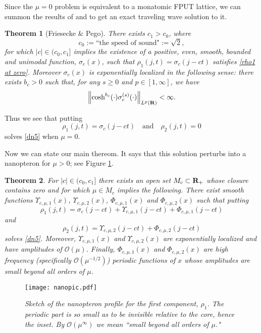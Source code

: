 \documentclass[12pt]{amsart}
\numberwithin{equation}{section}
\newtheorem{theorem}{Theorem}[section]
\newcommand{\be}{\begin{equation}}
\newcommand{\ee}{\end{equation}}
\newcommand{\mand}{\quad \text{and}\quad}
\newcommand{\R}{{\bf{R}}}
\renewcommand{\O}{{\mathcal{O}}}
\begin{document}
Since the $\mu=0$ problem is equivalent to a monatomic FPUT lattice, we can summon the results of \cite{friesecke-wattis} and \cite{friesecke-pego1}
to get an exact traveling wave solution to it.
\begin{theorem} [Friesecke \& Pego]\label{sigma exists}
There exists $c_1 > c_0$, where
\be \label{speed of sound}c_0:= \text{``the speed of sound"}:=\sqrt{2}, \ee 
for which  $|c| \in (c_0,c_1]$ 
implies the existence of a positive, even, smooth, bounded and unimodal function, $\sigma_c(x)$, 
such that
$\rho_1(j,t) = \sigma_c(j-ct)$
satisfies \eqref{rho1 at zero}. 
Moreover $\sigma_c(x)$ is exponentially localized
in the following sense: there exists
$b_c>0$ such that, for any $s \ge 0$ and $p \in [1,\infty]$, we have
\be\label{sigma is localized}
\left \| \cosh^{b_c}(\cdot)  {\sigma^{(s)}_c(\cdot) } \right\|_{L^p(\R)} < \infty.
\ee
\end{theorem}


Thus we see that putting
\be\label{mu zero}
\rho_1(j,t) = \sigma_c(j-ct) \mand \rho_2(j,t) = 0
\ee
solves \eqref{dn5} when $\mu =0$.

Now we can state our main thereom. It says that this solution 
perturbs into a nanopteron for $\mu > 0$; see Figure \ref{nanopic}.
\begin{theorem}\label{nontech main}
For $|c| \in (c_0,c_1]$
there exists an open set $M_c \subset \R_+$ whose
closure contains zero and for which $\mu \in M_c$ implies the following. There exist smooth functions 
$\Upsilon_{c,\mu,1}(x)$, $\Upsilon_{c,\mu,2}(x)$, $\Phi_{c,\mu,1}(x)$ and $\Phi_{c,\mu,2}(x)$ such that 
putting
$$\rho_1(j,t) = \sigma_c(j-ct)+\Upsilon_{c,\mu,1}(j-ct)+\Phi_{c,\mu,1}(j-ct)$$
and
$$\rho_2(j,t) = \Upsilon_{c,\mu,2}(j-ct)+\Phi_{c,\mu,2}(j-ct) $$ 
  solves \eqref{dn5}. Moreover, $\Upsilon_{c,\mu,1}(x)$ and $\Upsilon_{c,\mu,2}(x)$
 are exponentially localized and have amplitudes of $\O(\mu)$.
  Finally, $\Phi_{c,\mu,1}(x)$ and $\Phi_{c,\mu,2}(x)$
 are high frequency (specifically $\O(\mu^{-1/2})$) periodic functions of $x$ 
 whose amplitudes
are small beyond all orders of $\mu$.
\end{theorem}

\begin{figure}
{\centering
    \texttt{[image: nanopic.pdf]}
 \caption{  \it  Sketch of the nanopteron profile for the first component, $\rho_1$. The periodic
 part is so small as to be invisible relative to the core, hence the inset. By $\O(\mu^{\infty})$
 we mean ``small beyond all orders of $\mu$."}
 \label{nanopic}}
\end{figure}
\end{document}
